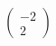 \documentclass[preview]{standalone}
\begin{document}
\begin{align*}
\begin{pmatrix}-2 \\ 2\end{pmatrix}
\end{align*}
\end{document}
